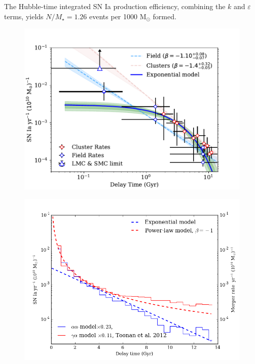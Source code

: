 \documentclass[apj]{aastex62}
\begin{document}
The Hubble-time integrated SN Ia production efficiency, combining the $k$ and $\varepsilon$ terms, yields $N/M_{\star}=1.26$ events per 1000 M$_{\odot}$ formed.


\begin{figure}[t] %
   \centering
   \includegraphics[width=6.5in]{figure_loglog_dtd}
   \caption{\footnotesize }
   \label{fig:logsnrate}
\end{figure}

\begin{figure}[t] %
   \centering
   \includegraphics[width=6.5in]{figure_toonan}
   \caption{\footnotesize }
   \label{fig:toonan}
\end{figure}
\acknowledgments
\end{document}

